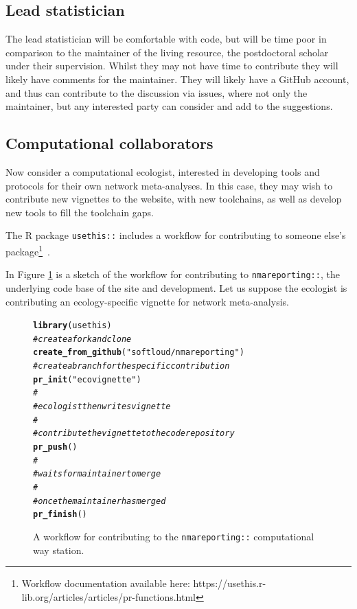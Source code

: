 \documentclass[12pt]{article}\usepackage[]{graphicx}\usepackage[]{color}
\makeatletter
\newcommand{\hlstr}[1]{\textcolor[rgb]{0.192,0.494,0.8}{#1}}%
\newcommand{\hlcom}[1]{\textcolor[rgb]{0.678,0.584,0.686}{\textit{#1}}}%
\newcommand{\hlstd}[1]{\textcolor[rgb]{0.345,0.345,0.345}{#1}}%
\newcommand{\hlkwd}[1]{\textcolor[rgb]{0.737,0.353,0.396}{\textbf{#1}}}%
\newenvironment{kframe}{%
 \def\at@end@of@kframe{}%
 \ifinner\ifhmode%
  \def\at@end@of@kframe{\end{minipage}}%
  \begin{minipage}{\columnwidth}%
 \fi\fi%
 \def\FrameCommand##1{\hskip\@totalleftmargin \hskip-\fboxsep
 \colorbox{shadecolor}{##1}\hskip-\fboxsep
     \hskip-\linewidth \hskip-\@totalleftmargin \hskip\columnwidth}%
 \MakeFramed {\advance\hsize-\width
   \@totalleftmargin\z@ \linewidth\hsize
   \@setminipage}}%
 {\par\unskip\endMakeFramed%
 \at@end@of@kframe}
\newenvironment{knitrout}{}{} %
\newcommand{\package}[1]{\texttt{{#1::}}}
\makeatother
\begin{document}
\subsection{Lead statistician}

The lead statistician will be comfortable with code, but will be time poor in comparison to the maintainer of the living resource, the postdoctoral scholar under their supervision. Whilst they may not have time to contribute they will likely have comments for the maintainer. They will likely have a GitHub account, and thus can contribute to the discussion via issues, where not only the maintainer, but any interested party can consider and add to the suggestions.

\subsection{Computational collaborators}

Now consider a computational ecologist, interested in developing tools and protocols for their own network meta-analyses. In this case, they may wish to contribute new vignettes to the website, with new toolchains, as well as develop new tools to fill the toolchain gaps.

The R package \package{usethis} includes a workflow for contributing to someone else's package\footnote{Workflow documentation available here: https://usethis.r-lib.org/articles/articles/pr-functions.html}~\cite{wickham_usethis:_2019}.

In Figure \ref{fig:workflow} is a sketch of the workflow for contributing to \package{nmareporting}, the underlying code base of the site and development. Let us suppose the ecologist is contributing an ecology-specific vignette for network meta-analysis.

\begin{figure}

\begin{knitrout}
\color{fgcolor}\begin{kframe}
\begin{alltt}
\hlkwd{library}\hlstd{(usethis)}
\hlcom{# create a fork and clone}
\hlkwd{create_from_github}\hlstd{(}\hlstr{"softloud/nmareporting"}\hlstd{)}
\hlcom{# create a branch for the specific contribution}
\hlkwd{pr_init}\hlstd{(}\hlstr{"ecovignette"}\hlstd{)}
\hlcom{#}
\hlcom{# ecologist then writes vignette}
\hlcom{#}
\hlcom{# contribute the vignette to the code repository}
\hlkwd{pr_push}\hlstd{()}
\hlcom{#}
\hlcom{# waits for maintainer to merge}
\hlcom{#}
\hlcom{# once the maintainer has merged}
\hlkwd{pr_finish}\hlstd{()}
\end{alltt}
\end{kframe}
\end{knitrout}

\caption{A workflow for contributing to the \package{nmareporting} computational way station.}
\label{fig:workflow}
\end{figure}
\end{document}
